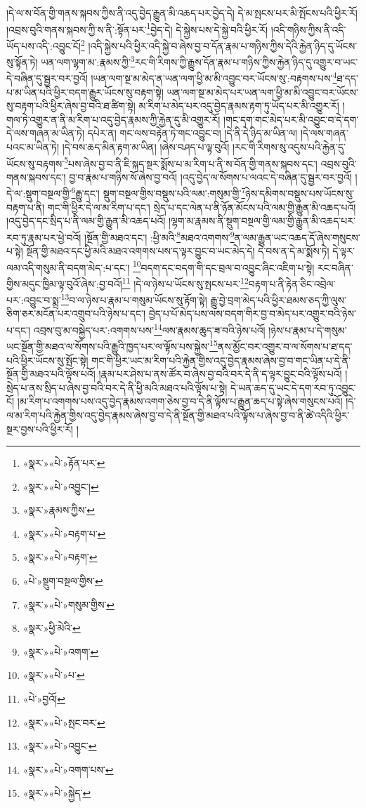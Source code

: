 །དེ་ལ་ས་བོན་གྱི་གནས་སྐབས་ཀྱིས་ནི་འདུ་བྱེད་རྒྱུན་མི་འཆད་པར་བྱེད་དེ། དེ་མ་སྤངས་པར་མི་སྤོངས་པའི་ཕྱིར་རོ། །འབྲས་བུའི་གནས་སྐབས་ཀྱི་ས་ནི་:སྟོན་པར་\footnote{«སྣར་»«པེ་»རྟོན་པར་}བྱེད་དེ། དེ་སྐྱེས་པས་དེ་སྐྱེ་བའི་ཕྱིར་རོ། །འདི་གཉིས་ཀྱིས་ནི་འདི་ཡོད་པས་འདི་:འབྱུང་ངོ།\footnote{«སྣར་»«པེ་»འབྱུང་།} །འདི་སྐྱེས་པའི་ཕྱིར་འདི་སྐྱེ་བ་ཞེས་བྱ་བ་དོན་རྣམ་པ་གཉིས་ཀྱིས་དེའི་རྐྱེན་ཉིད་དུ་ཡོངས་སུ་སྟོན་ཏེ། ཡན་ལག་ལྷག་མ་:རྣམས་ཀྱི་\footnote{«སྣར་»རྣམས་ཀྱིས་}རང་གི་རིགས་ཀྱི་རྒྱུས་དོན་རྣམ་པ་གཉིས་ཀྱིས་རྐྱེན་ཉིད་དུ་འགྱུར་བ་ཡང་དེ་བཞིན་དུ་སྦྱར་བར་བྱའོ། །ཡན་ལག་སྔ་མ་མེད་ན་ཡན་ལག་ཕྱི་མ་མི་འབྱུང་བར་ཡོངས་སུ་:བརྟགས་པས་\footnote{«སྣར་»«པེ་»བརྟག་པ་}ཐ་དད་པ་མ་ཡིན་པའི་ཕྱིར་བདག་རྒྱུར་ཡོངས་སུ་བརྟག་སྟེ། ཡན་ལག་སྔ་མ་མེད་པར་ཡན་ལག་ཕྱི་མ་མི་འབྱུང་བར་ཡོངས་སུ་བརྟག་པའི་ཕྱིར་ཞེས་བྱ་བའི་ཐ་ཚིག་སྟེ། མ་རིག་པ་མེད་པར་འདུ་བྱེད་རྣམས་རྟག་ཏུ་ཡོད་པར་མི་འགྱུར་རོ། །གལ་ཏེ་འགྱུར་ན་ནི་མ་རིག་པ་འདུ་བྱེད་རྣམས་ཀྱི་རྐྱེན་དུ་མི་འགྱུར་རོ། །གང་དག་གང་མེད་པར་མི་འབྱུང་བ་དེ་དག་དེ་ལས་གཞན་མ་ཡིན་ཏེ། དཔེར་ན། གང་ལས་བརྟེན་ཏེ་གང་འབྱུང་བ། །དེ་ནི་དེ་ཉིད་མ་ཡིན་ལ། །དེ་ལས་གཞན་པའང་མ་ཡིན་ཏེ། །དེ་བས་ཆད་མིན་རྟག་མ་ཡིན། །ཞེས་བཤད་པ་ལྟ་བུའོ། །རང་གི་རིགས་སུ་འདུས་པའི་རྐྱེན་དུ་ཡོངས་སུ་བརྟགས་\footnote{«སྣར་»«པེ་»བརྟག་}པས་ཞེས་བྱ་བ་ནི་ཇི་སྐད་སྔར་སྨོས་པ་མ་རིག་པ་ནི་ས་བོན་གྱི་གནས་སྐབས་དང་། འབྲས་བུའི་གནས་སྐབས་དང་། བྱ་བ་རྣམ་པ་གཉིས་སོ་ཞེས་བྱ་བའོ། །འདུ་བྱེད་ལ་སོགས་པ་ལའང་དེ་བཞིན་དུ་སྦྱར་བར་བྱའོ། །དེ་ལ་:སྡུག་བསྔལ་གྱི་\footnote{«པེ་»སྡུག་བསྔལ་གྱིས་}རྒྱུ་དང་། སྡུག་བསྔལ་གྱིས་བསྡུས་པའི་ལམ་:གསུམ་གྱི་\footnote{«སྣར་»«པེ་»གསུམ་གྱིས་}ཉེས་དམིགས་བསྡུས་པས་ཡོངས་སུ་བརྟག་པ་ནི། གང་གི་ཕྱིར་དེ་ལ་མ་རིག་པ་དང་། སྲེད་པ་དང་ལེན་པ་ནི་ཉོན་མོངས་པའི་ལམ་གྱི་རྒྱུན་མི་འཆད་པའོ། །འདུ་བྱེད་དང་སྲིད་པ་ནི་ལམ་གྱི་རྒྱུན་མི་འཆད་པའོ། །ལྷག་མ་རྣམས་ནི་སྡུག་བསྔལ་གྱི་ལམ་གྱི་རྒྱུན་མི་འཆད་པར་རབ་ཏུ་རྣམ་པར་ཕྱེ་བའོ། །སྔོན་གྱི་མཐའ་དང་། :ཕྱི་མའི་\footnote{«སྣར་»ཕྱི་མེའི་}མཐའ་འགགས་\footnote{«སྣར་»«པེ་»འགག་}ན་ལམ་རྒྱུན་ཡང་འཆད་དོ་ཞེས་གསུངས་པ་སྟེ། སྔོན་གྱི་མཐའ་དང་ཕྱི་མའི་མཐའ་འགགས་པས་ད་ལྟར་བྱུང་བ་ཡང་མེད་དེ། དེ་བས་ན་དེ་མ་སྨོས་ཏེ། དེ་ལྟར་ལམ་འདི་གསུམ་ནི་བདག་མེད་:པ་དང་། \footnote{«སྣར་»«པེ་»པ་}བདག་དང་བདག་གི་དང་བྲལ་བ་འབྱུང་ཞིང་འཇིག་པ་སྟེ། རང་བཞིན་གྱིས་མདུང་ཁྱིམ་ལྟ་བུའོ་ཞེས་:བྱ་བའོ།\footnote{«པེ་»བྱའོ།} །དེ་ལ་ཉེས་པ་ཡོངས་སུ་སྤངས་པར་\footnote{«སྣར་»«པེ་»སྤང་བར་}བརྟག་པ་ནི་རྟེན་ཅིང་འབྲེལ་པར་:འབྱུང་བ་སྨྲ་\footnote{«སྣར་»«པེ་»འབྱུང་}བ་ལ་ཉེས་པ་རྣམ་པ་གསུམ་ཡོངས་སུ་རྟོག་སྟེ། རྒྱུ་བྱེ་བྲག་མེད་པའི་ཕྱིར་ཐམས་ཅད་ཀྱི་ལུས་ཅིག་ཅར་མངོན་པར་འགྲུབ་པའི་ཉེས་པ་དང་། བྱེད་པ་པོ་མེད་པས་ལས་བདག་གིར་བྱ་བ་མེད་པར་འགྱུར་བའི་ཉེས་པ་དང་། འབྲས་བུ་མ་བསྐྱེད་པར་:འགགས་པས་\footnote{«སྣར་»«པེ་»འགག་པས་}ལས་རྣམས་ཆུད་ཟ་བའི་ཉེས་པའོ། །ཉེས་པ་རྣམ་པ་དེ་གསུམ་ཡང་སྔོན་གྱི་མཐའ་ལ་སོགས་པའི་རྒྱུའི་ཁྱད་པར་ལ་ལྟོས་པས་སྐྱེས་\footnote{«སྣར་»«པེ་»སྐྱེད་}ནས་མྱོང་བར་འགྱུར་བ་ལ་སོགས་པ་ཐ་དད་པའི་ཕྱིར་ཡོངས་སུ་སྤོང་སྟེ། གང་གི་ཕྱིར་ཡང་མ་རིག་པའི་རྐྱེན་གྱིས་འདུ་བྱེད་རྣམས་ཞེས་བྱ་བ་གང་ཡིན་པ་དེ་ནི་སྔོན་གྱི་མཐའ་པའི་ལྟོས་པའོ། །རྣམ་པར་ཤེས་པ་ནས་ཚོར་བ་ཞེས་བྱ་བའི་བར་དེ་ནི་ད་ལྟར་བྱུང་བའི་ལྟོས་པའོ། །སྲེད་པ་ནས་སྲིད་པ་ཞེས་བྱ་བའི་བར་དེ་ནི་ཕྱི་མའི་མཐའ་པའི་ལྟོས་པ་སྟེ། དེ་ཡན་ཆད་དུ་ཡང་དེ་དག་རབ་ཏུ་འབྱུང་ངོ། །མ་རིག་པ་འགགས་པས་འདུ་བྱེད་རྣམས་འགག་ཅེས་བྱ་བ་དེ་ནི་ལྟོས་པ་རྒྱུན་ཆད་པ་སྟེ་ཞེས་གསུངས་པའོ། །དེ་ལ་མ་རིག་པའི་རྐྱེན་གྱིས་འདུ་བྱེད་རྣམས་ཞེས་བྱ་བ་དེ་ནི་སྔོན་གྱི་མཐའ་པའི་ལྟོས་པ་ཞེས་བྱ་བ་ནི་ཚེ་འདིའི་ཕྱིར་སྔར་བྱས་པའི་ཕྱིར་རོ། །
